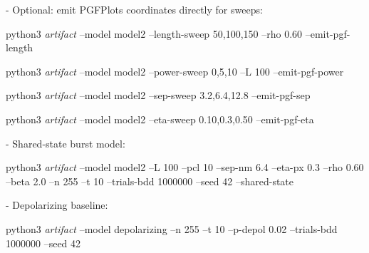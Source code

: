 \documentclass{article}
\newcommand{\cmd}[1]{\par\noindent\begingroup\scriptsize\ttfamily\raggedright\sloppy #1\par\endgroup}
\newcommand{\simL}{100}
\newcommand{\simpcl}{10}
\newcommand{\simsep}{6.4}
\newcommand{\simeta}{0.3}
\newcommand{\simn}{255}
\newcommand{\simt}{10}
\newcommand{\simtrials}{1000000}
\newcommand{\simseed}{42}
\newcommand{\simrhoB}{0.60}
\newcommand{\simLfa}{50}
\newcommand{\simLfb}{150}
\newcommand{\simpclA}{0}
\newcommand{\simpclB}{5}
\newcommand{\simpclC}{10}
\newcommand{\simsepA}{3.2}
\newcommand{\simsepB}{12.8}
\newcommand{\simetaA}{0.10}
\newcommand{\simetaB}{0.50}
\newcommand{\simDepolP}{0.02}
\begin{document}
- Optional: emit PGFPlots coordinates directly for sweeps:
\cmd{python3 \emph{artifact} --model model2 --length-sweep \simLfa{},\simL{},\simLfb{} --rho \simrhoB{} --emit-pgf-length}
\cmd{python3 \emph{artifact} --model model2 --power-sweep \simpclA{},\simpclB{},\simpclC{} --L \simL{} --emit-pgf-power}
\cmd{python3 \emph{artifact} --model model2 --sep-sweep \simsepA{},\simsep{},\simsepB{} --emit-pgf-sep}
\cmd{python3 \emph{artifact} --model model2 --eta-sweep \simetaA{},\simeta{},\simetaB{} --emit-pgf-eta}
- Shared-state burst model:
\cmd{python3 \emph{artifact} --model model2 --L \simL{} --pcl \simpcl{} --sep-nm \simsep{} --eta-px \simeta{} --rho \simrhoB{} --beta 2.0 --n \simn{} --t \simt{} --trials-bdd \simtrials{} --seed \simseed{} --shared-state}
- Depolarizing baseline:
\cmd{python3 \emph{artifact} --model depolarizing --n \simn{} --t \simt{} --p-depol \simDepolP{} --trials-bdd \simtrials{} --seed \simseed}
\end{document}
